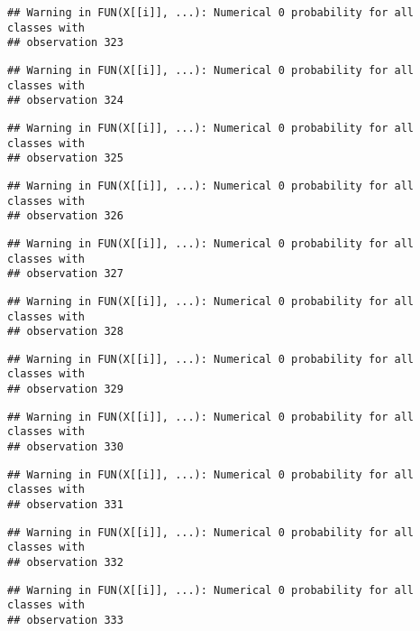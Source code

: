 \documentclass[
]{article}
\begin{document}
\begin{verbatim}
## Warning in FUN(X[[i]], ...): Numerical 0 probability for all classes with
## observation 323
\end{verbatim}

\begin{verbatim}
## Warning in FUN(X[[i]], ...): Numerical 0 probability for all classes with
## observation 324
\end{verbatim}

\begin{verbatim}
## Warning in FUN(X[[i]], ...): Numerical 0 probability for all classes with
## observation 325
\end{verbatim}

\begin{verbatim}
## Warning in FUN(X[[i]], ...): Numerical 0 probability for all classes with
## observation 326
\end{verbatim}

\begin{verbatim}
## Warning in FUN(X[[i]], ...): Numerical 0 probability for all classes with
## observation 327
\end{verbatim}

\begin{verbatim}
## Warning in FUN(X[[i]], ...): Numerical 0 probability for all classes with
## observation 328
\end{verbatim}

\begin{verbatim}
## Warning in FUN(X[[i]], ...): Numerical 0 probability for all classes with
## observation 329
\end{verbatim}

\begin{verbatim}
## Warning in FUN(X[[i]], ...): Numerical 0 probability for all classes with
## observation 330
\end{verbatim}

\begin{verbatim}
## Warning in FUN(X[[i]], ...): Numerical 0 probability for all classes with
## observation 331
\end{verbatim}

\begin{verbatim}
## Warning in FUN(X[[i]], ...): Numerical 0 probability for all classes with
## observation 332
\end{verbatim}

\begin{verbatim}
## Warning in FUN(X[[i]], ...): Numerical 0 probability for all classes with
## observation 333
\end{verbatim}
\end{document}
